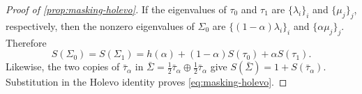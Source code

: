 \documentclass[11pt]{article}
\theoremstyle{remark}
\begin{document}
\begin{proof}[Proof of \cref{prop:masking-holevo}]
If the eigenvalues of $\tau_0$ and $\tau_1$ are $\{\lambda_i\}_i$ and $\{\mu_j\}_j$, respectively, then the nonzero eigenvalues of $\Sigma_0$ are $\{(1-\alpha)\lambda_i\}_i$ and $\{\alpha\mu_j\}_j$. Therefore
\begin{equation*}
S(\Sigma_0) = S(\Sigma_1)
= h(\alpha)+(1-\alpha)S(\tau_0)+\alpha S(\tau_1).
\end{equation*}
Likewise, the two copies of $\bar{\tau}_\alpha$ in $\bar{\Sigma} = \frac{1}{2}\bar{\tau}_\alpha \oplus \frac{1}{2}\bar{\tau}_\alpha$ give $S(\bar{\Sigma}) = 1+S(\bar{\tau}_\alpha)$. Substitution in the Holevo identity proves \eqref{eq:masking-holevo}.
\end{proof}
\end{document}
